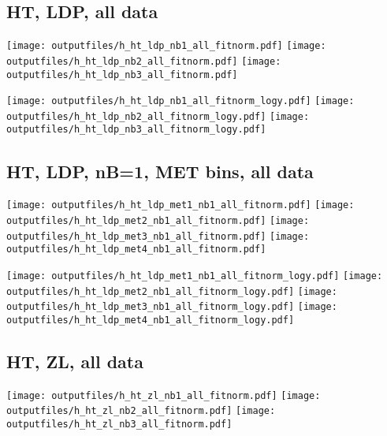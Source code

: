 \documentclass[11pt]{article}
\begin{document}
    \subsection{ HT, LDP, all data}

    \noindent
     \texttt{[image: outputfiles/h\_ht\_ldp\_nb1\_all\_fitnorm.pdf]}
     \texttt{[image: outputfiles/h\_ht\_ldp\_nb2\_all\_fitnorm.pdf]}
     \texttt{[image: outputfiles/h\_ht\_ldp\_nb3\_all\_fitnorm.pdf]}

    \noindent
     \texttt{[image: outputfiles/h\_ht\_ldp\_nb1\_all\_fitnorm\_logy.pdf]}
     \texttt{[image: outputfiles/h\_ht\_ldp\_nb2\_all\_fitnorm\_logy.pdf]}
     \texttt{[image: outputfiles/h\_ht\_ldp\_nb3\_all\_fitnorm\_logy.pdf]}

     \subsection{ HT, LDP, nB=1, MET bins, all data}

    \noindent
     \texttt{[image: outputfiles/h\_ht\_ldp\_met1\_nb1\_all\_fitnorm.pdf]}
     \texttt{[image: outputfiles/h\_ht\_ldp\_met2\_nb1\_all\_fitnorm.pdf]}
     \texttt{[image: outputfiles/h\_ht\_ldp\_met3\_nb1\_all\_fitnorm.pdf]}
     \texttt{[image: outputfiles/h\_ht\_ldp\_met4\_nb1\_all\_fitnorm.pdf]}

    \noindent
     \texttt{[image: outputfiles/h\_ht\_ldp\_met1\_nb1\_all\_fitnorm\_logy.pdf]}
     \texttt{[image: outputfiles/h\_ht\_ldp\_met2\_nb1\_all\_fitnorm\_logy.pdf]}
     \texttt{[image: outputfiles/h\_ht\_ldp\_met3\_nb1\_all\_fitnorm\_logy.pdf]}
     \texttt{[image: outputfiles/h\_ht\_ldp\_met4\_nb1\_all\_fitnorm\_logy.pdf]}

   \clearpage

     \subsection{ HT, ZL, all data}

    \noindent
     \texttt{[image: outputfiles/h\_ht\_zl\_nb1\_all\_fitnorm.pdf]}
     \texttt{[image: outputfiles/h\_ht\_zl\_nb2\_all\_fitnorm.pdf]}
     \texttt{[image: outputfiles/h\_ht\_zl\_nb3\_all\_fitnorm.pdf]}
\end{document}
